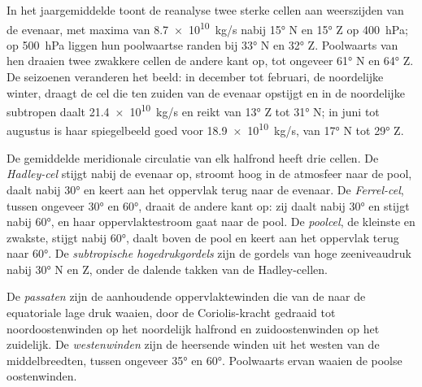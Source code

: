 In het jaargemiddelde toont de reanalyse twee sterke cellen aan weerszijden van de evenaar, met maxima van \qty{8.7e10}{kg/s} nabij \ang{15} N en \ang{15} Z op \qty{400}{hPa}; op \qty{500}{hPa} liggen hun poolwaartse randen bij \ang{33} N en \ang{32} Z. Poolwaarts van hen draaien twee zwakkere cellen de andere kant op, tot ongeveer \ang{61} N en \ang{64} Z.
De seizoenen veranderen het beeld: in december tot februari, de noordelijke winter, draagt de cel die ten zuiden van de evenaar opstijgt en in de noordelijke subtropen daalt \qty{21.4e10}{kg/s} en reikt van \ang{13} Z tot \ang{31} N; in juni tot augustus is haar spiegelbeeld goed voor \qty{18.9e10}{kg/s}, van \ang{17} N tot \ang{29} Z.

\begin{definition}\label{def:b1:atmospheric-circulation:cells}
De gemiddelde meridionale circulatie van elk halfrond heeft drie cellen. De \emph{Hadley-cel} stijgt nabij de evenaar op, stroomt hoog in de atmosfeer naar de pool, daalt nabij \ang{30} en keert aan het oppervlak terug naar de evenaar. De \emph{Ferrel-cel}, tussen ongeveer \ang{30} en \ang{60}, draait de andere kant op: zij daalt nabij \ang{30} en stijgt nabij \ang{60}, en haar oppervlaktestroom gaat naar de pool. De \emph{poolcel}, de kleinste en zwakste, stijgt nabij \ang{60}, daalt boven de pool en keert aan het oppervlak terug naar \ang{60}. De \emph{subtropische hogedrukgordels} zijn de gordels van hoge zeeniveaudruk nabij \ang{30} N en Z, onder de dalende takken van de Hadley-cellen.
\end{definition}

\begin{definition}\label{def:b1:atmospheric-circulation:winds}
De \emph{passaten} zijn de aanhoudende oppervlaktewinden die van de  naar de equatoriale lage druk waaien, door de Coriolis-kracht gedraaid tot noordoostenwinden op het noordelijk halfrond en zuidoostenwinden op het zuidelijk. De \emph{westenwinden} zijn de heersende winden uit het westen van de middelbreedten, tussen ongeveer \ang{35} en \ang{60}. Poolwaarts ervan waaien de poolse oostenwinden.
\end{definition}


